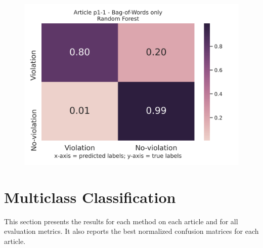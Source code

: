 \documentclass{article}
\begin{document}
\begin{figure}[!htb]
	\centering
    \includegraphics[scale=0.5]{data/analysis/cm/binary_cm_normalized_test_article_p1-1.png}  
\end{figure}

\newpage

\section{Multiclass Classification}

This section presents the results for each method on each article and for all evaluation metrics.
It also reports the best normalized confusion matrices for each article.\\

\noindent
	~\\
	~\\
	~\\
	~\\
	~\\
	~\\
\end{document}
